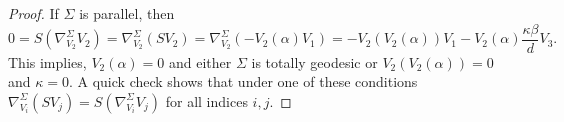 \documentclass{amsart}
\theoremstyle{plain}
\theoremstyle{remark}
\begin{document}
{\begin{proof}
%
\vspace{1mm}\noindent
If $\Sigma$ is parallel, then 
%
%
\[
0 = S(\nabla^\Sigma_{V_2} V_2 ) = \nabla^\Sigma_{V_2} (SV_2) = \nabla^\Sigma_{V_2} (-V_2(\alpha) V_1) = -V_2(V_2(\alpha))V_1 - V_2(\alpha)\frac{\kappa \beta}{d} V_3.
\]
This implies, $V_2(\alpha)=0$ and either $\Sigma$ is totally geodesic or $V_2(V_2(\alpha))=0$ and  $\kappa = 0$. A quick check shows that under one of these conditions $\nabla^\Sigma_{V_i} (SV_j) = S(\nabla^\Sigma_{V_i} V_j)$ for all indices $i,j$.


\end{proof}}
\end{document}
